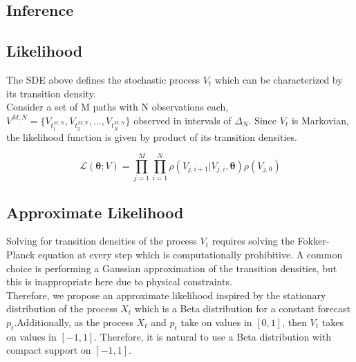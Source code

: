 \documentclass[ima, 20pt, portrait, plainboxedsections]{sciposter}
\newcommand{\E}{\mathbb{E}}
\newcommand{\V}{\mathbb{V}}
\begin{document}
\begin{multicols}{3}
\section*{Inference}

\subsection*{Likelihood}
The SDE above defines the stochastic process $V_t$ which can be characterized by its transition density. \\

Consider a set of M paths with N observations each, $ V^{M,N}=\{ V_{t_1^{M,N}} , V_{t_2^{M,N}} ,\ldots , V_{t_N^{M,N}} \}$ observed in intervals of $\Delta_N$. Since $V_t$ is Markovian, the likelihood function is given by  product of its  transition densities.

\begin{equation}
\mathcal{L}(\bm{\theta};V) =\prod\limits_{j=1}^M \prod\limits_{i=1}^N \rho ( {V_{j,i+1}|V_{j,i}}, \bm{\theta})  \rho (V_{j,0})
\label{likelihood}
\end{equation}

\subsection*{Approximate Likelihood}
Solving for transition densities of the process $V_t$ requires solving the Fokker-Planck equation at every step which is computationally prohibitive. A common choice is performing a  Gaussian approximation of the transition densities, but this is inappropriate here due to physical constraints. \\

Therefore, we propose an approximate likelihood inspired by the stationary distribution of the process $X_t$ which is a Beta distribution for a constant forecast $p_t$.Additionally,  as the process $X_t$ and $p_t$ take on values in $[0,1]$, then $V_t$ takes on values in $[-1,1]$. Therefore,  it is natural to use a  Beta distribution with compact support on $[-1,1]$.

%


\end{multicols}
\end{document}
